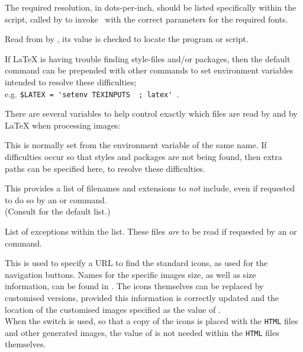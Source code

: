 \begin{htmllist}
\begin{htmllist}
\item [\fn{\$METAFONT\_DPI}\texttt{ = 180;}]
The required resolution, in dots-per-inch, should be listed specifically
within the  script, called by  to invoke \MF\ with
the correct parameters for the required fonts.
%
\end{htmllist}


\item [\fn{\$LATEX}\texttt{ = 'latex';}]
Read from  by , 
its value is checked to locate the  program or script.

\smallskip\noindent
If \LaTeX{} is having trouble finding style-files and/or packages, then
the default command can be prepended with other commands 
to set environment variables intended to resolve these difficulties;\\
e.g. 
\verb|$LATEX = 'setenv TEXINPUTS |\verb| ; latex' |.

There are several variables to help control exactly which files are
read by \latextohtml{} and by \LaTeX{} when processing images:

\begin{htmllist}%
\item [\fn{\$TEXINPUTS}]
This is normally set from the environment variable of the same name.
If difficulties occur so that styles and packages are not being found, 
then extra paths can be specified here, to resolve these difficulties.

\item [\fn{\$DONT\_INCLUDE}]
This provides a list of filenames and extensions to \emph{not} include, 
even if requested to do so by an  or  command.\\
(Consult  for the default list.)

\item [\fn{\$DO\_INCLUDE}\texttt{ = '';}]
List of exceptions within the  list.
These files \emph{are} to be read if requested by an 
or  command.
\end{htmllist}


\item [\fn{\$ICONSERVER}\texttt{ = '\Meta{URL}';}]
This is used to specify a URL to find the standard icons, as used for the
navigation buttons.\html{\\}
Names for the specific images size, as well as size information, 
can be found in . The icons themselves can be replaced
by customised versions, provided this information is correctly updated
and the location of the customised images specified as the value
of .\\
When the  switch is used,
so that a copy of the icons is placed with the \texttt{HTML} files and other
generated images, the value of  is not needed within
the \texttt{HTML} files themselves.


\end{htmllist}
